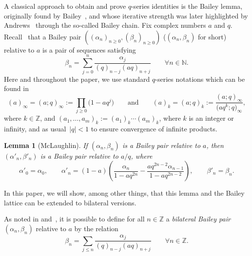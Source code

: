 \documentclass[11pt]{article}
\numberwithin{equation}{section}
\newtheorem{Lemma}[Theorem]{Lemma}
\newcommand{\field}[1]{\mathbb{#1}}
\newcommand{\Z}{\field{Z}}
\begin{document}
A classical approach to obtain and prove $q$-series identities is the Bailey lemma, originally found by Bailey~\cite{Ba}, and whose iterative strength was later highlighted by Andrews~\cite{A1, A2, AAR} through the so-called Bailey chain.
Fix complex numbers $a$ and $q$. Recall~\cite{Ba} that a Bailey pair $((\alpha_n)_{n\geq0}, (\beta_n)_{n\geq0})$ ($(\alpha_n, \beta_n)$ for short) relative to $a$ is a pair of sequences satisfying
\begin{equation}\label{bp}
\beta_n=\sum_{j=0}^n\frac{\alpha_j}{(q)_{n-j}(aq)_{n+j}}\qquad\forall n\in\mathbb{N}.
\end{equation}
Here and throughout the paper, we use standard $q$-series notations which can be found in~\cite{GR}
\begin{equation*}
(a)_\infty = (a;q)_\infty:=\prod_{j\geq 0}\bigl(1-aq^j\bigr)\qquad\mbox{and}\qquad(a)_k = (a;q)_k:=\frac{(a;q)_\infty}{\bigl(aq^k;q\bigr)_\infty},
\end{equation*}
where $k \in \Z$, and
$
(a_1,\ldots,a_m)_k:=(a_1)_k\cdots(a_m)_k$,
where $k$ is an integer or infinity, and as usual~${|q|<1}$ to ensure convergence of infinite products.

\setcounter{Theorem}{4}\setcounter{equation}{3}
\begin{Lemma}[McLaughlin]
\label{lem:Mac}
If $(\alpha_n, \beta_n)$ is a Bailey pair relative to $a$, then $(\alpha'_n, \beta'_n)$ is a Bailey pair relative to $a/q$, where
\begin{equation*}
\alpha'_0=\alpha_0, \qquad \alpha'_n=(1-a)\left(\frac{\alpha_n}{1-aq^{2n}}-\frac{aq^{2n-2}\alpha_{n-1}}{1-aq^{2n-2}}\right), \qquad \beta'_n=\beta_n.
\end{equation*}
\end{Lemma}

In this paper, we will show, among other things, that this lemma and the Bailey lattice can be extended to bilateral versions.


As noted in \cite{BMS} and~\cite{J}, it is possible to define for all $n\in\mathbb{Z}$ a \emph{bilateral Bailey pair} $(\alpha_n, \beta_n)$ relative to $a$ by the relation
\begin{equation}\label{bbp}
\beta_n=\sum_{j\leq n}\frac{\alpha_j}{(q)_{n-j}(aq)_{n+j}}\qquad\forall n\in\mathbb{Z}.
\end{equation}
\end{document}
